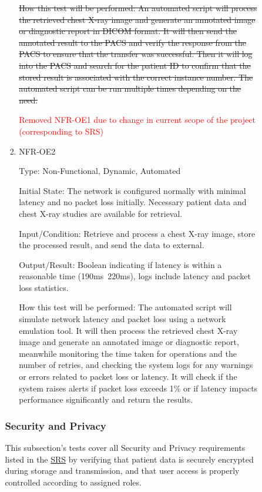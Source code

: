 \documentclass[12pt, titlepage]{article}
\begin{document}
\begin{enumerate}
\begin{enumerate}
\begin{enumerate}
\begin{enumerate}
\sout{How this test will be performed: An automated script will process the retrieved chest X-ray image and generate an annotated image or diagnostic report in DICOM format. It will then send the annotated result to the PACS and verify the response from the PACS to ensure that the transfer was successful. Then it will log into the PACS and search for the patient ID to confirm that the stored result is associated with the correct instance number. The automated script can be run multiple times depending on the need.}


\textcolor{red}{Removed NFR-OE1 due to change in current scope of the project (corresponding to SRS)}

\item{NFR-OE2\\}\label{NFR-OE2}

Type: Non-Functional, Dynamic, Automated

Initial State: The network is configured normally with minimal latency and no packet loss initially. Necessary patient data and chest X-ray studies are available for retrieval.

Input/Condition: Retrieve and process a chest X-ray image, store the processed result, and send the data to external.

Output/Result: Boolean indicating if latency is within a reasonable time (190ms~220ms), logs include latency and packet loss statistics.

How this test will be performed: The automated script will simulate network latency and packet loss using a network emulation tool. It will then process the retrieved chest X-ray image and generate an annotated image or diagnostic report, meanwhile monitoring the time taken for operations and the number of retries, and checking the system logs for any warnings or errors related to packet loss or latency. It will check if the system raises alerts if packet loss exceeds 1\% or if latency impacts performance significantly and return the results.

\end{enumerate}

\subsubsection{Security and Privacy}

This subsection's tests cover all Security and Privacy requirements listed in the \href{https://github.com/RezaJodeiri/CXR-Capstone/blob/main/docs/SRS/SRS.pdf}{SRS} \citep{SRS}
 by verifying that patient data is securely encrypted during storage and transmission, and that user access is properly controlled according to assigned roles.


\end{enumerate}
\end{enumerate}
\end{enumerate}
\end{document}
